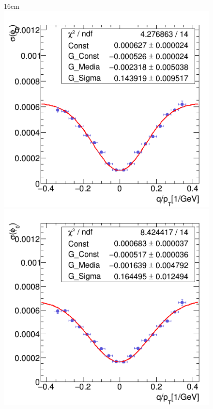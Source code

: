 \begin{figure}[htbp]{16cm}
\includegraphics[scale=0.28]{AppendixCMSL1TT/figs/r_phi0_fit_single_muon_nopu}
\includegraphics[scale=0.28]{AppendixCMSL1TT/figs/r_phi0_fit_single_electron_nopu}\\

\end{figure}
